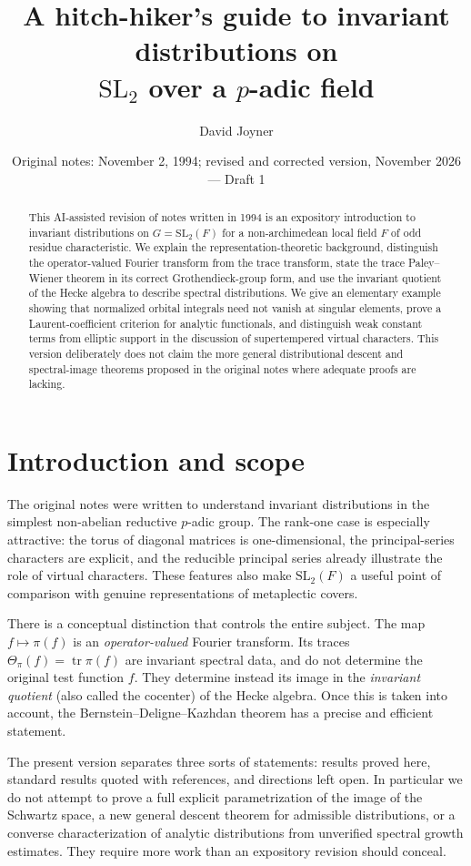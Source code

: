 \documentclass[12pt,letterpaper]{amsart}
\title[A hitch-hiker's guide to invariant distributions]{A hitch-hiker's guide to invariant distributions on \\ $\mathrm{SL}_2$ over a $p$-adic field}
\author{David Joyner}
\date{Original notes: November 2, 1994; revised and corrected version, November 2026 --- Draft 1}
\numberwithin{equation}{section}
\theoremstyle{definition}
\theoremstyle{remark}
\newcommand{\tr}{\operatorname{tr}}
\begin{document}
\begin{abstract}
This AI-assisted revision of notes written in 1994 is an expository introduction to invariant distributions on $G=\mathrm{SL}_2(F)$ for a non-archimedean local field $F$ of odd residue characteristic.  We explain the representation-theoretic background, distinguish the operator-valued Fourier transform from the trace transform, state the trace Paley--Wiener theorem in its correct Grothendieck-group form, and use the invariant quotient of the Hecke algebra to describe spectral distributions. We give an elementary example showing that normalized orbital integrals need not vanish at singular elements, prove a Laurent-coefficient criterion for analytic functionals, and distinguish weak constant terms from elliptic support in the discussion of supertempered virtual characters.  This version deliberately does not claim the more general distributional descent and spectral-image theorems proposed in the original notes where adequate proofs are lacking.
\end{abstract}
\maketitle
\tableofcontents

\section{Introduction and scope}\label{sec:intro}
The original notes were written to understand invariant distributions in the simplest non-abelian reductive $p$-adic group.  The rank-one case is especially attractive: the torus of diagonal matrices is one-dimensional, the principal-series characters are explicit, and the reducible principal series already illustrate the role of virtual characters.  These features also make $\mathrm{SL}_2(F)$ a useful point of comparison with genuine representations of metaplectic covers.

There is a conceptual distinction that controls the entire subject.  The map $f\mapsto\pi(f)$ is an \emph{operator-valued} Fourier transform.  Its traces $\Theta_\pi(f)=\tr\pi(f)$ are invariant spectral data, and do not determine the original test function $f$.  They determine instead its image in the \emph{invariant quotient} (also called the cocenter) of the Hecke algebra.  Once this is taken into account, the Bernstein--Deligne--Kazhdan theorem has a precise and efficient statement.

The present version separates three sorts of statements: results proved here, standard results quoted with references, and directions left open.  In particular we do not attempt to prove a full explicit parametrization of the image of the Schwartz space, a new general descent theorem for admissible distributions, or a converse characterization of analytic distributions from unverified spectral growth estimates.  They require more work than an expository revision should conceal.
\end{document}
